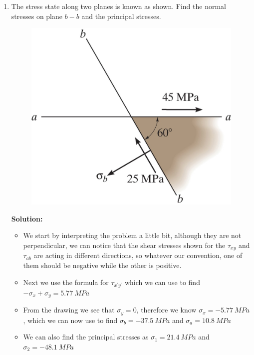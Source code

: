 \documentclass[12pt, oneside]{article}
\begin{document}
\begin{enumerate}
	\item %
		The stress state along two planes is known as shown.
		Find the normal stresses on plane $b-b$ and the principal stresses.
		\begin{figure}[H]
			\centering
			\includegraphics[width=0.6\linewidth]{9-20}
		\end{figure}
			\textbf{Solution:}
			\begin{itemize}
				\item We start by interpreting the problem a little bit, although they are not perpendicular, we can notice that the shear stresses shown for the $\tau_{xy}$ and $\tau_{ab}$ are acting in different directions, so whatever our convention, one of them should be negative while the other is positive.
				\item Next we use the formula for $\tau_{x^\prime y^\prime}$ which we can use to find $-\sigma_x+\sigma_y = 	\SI{5.77}{MPa} $
				\item From the drawing we see that $\sigma_y = 0$, therefore we know $\sigma_x = 	\SI{-5.77}{MPa} $, which we can now use to find $\sigma_b = 	\SI{-37.5 }{MPa} $ and $\sigma_a = 	\SI{10.8 }{MPa} $
				\item We can also find the principal stresses as $\sigma_1 = 	\SI{21.4 }{MPa} $ and $\sigma_2 = 	\SI{-48.1 }{MPa} $
			\end{itemize}


\end{enumerate}
\end{document}
